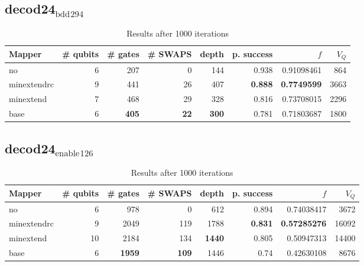 \documentclass[11pt]{article}
\begin{document}
\subsection{decod24\(_{\text{bdd}}\)\(_{\text{294}}\)}
\label{sec:org6fa2b82}
\begin{table}[H]
\caption{\label{tab:org4fd8b84}
Results after 1000 iterations}
\centering
\small
\begin{tabular}{lrrrrrrr}
\hline
Mapper & \# qubits & \# gates & \# SWAPS & depth & p. success & \(f\) & \(V_Q\)\\
\hline
no & 6 & 207 & 0 & 144 & 0.938 & 0.91098461 & 864\\
\hline
minextendrc & 9 & 441 & 26 & 407 & \textbf{0.888} & \textbf{0.7749599} & 3663\\
minextend & 7 & 468 & 29 & 328 & 0.816 & 0.73708015 & 2296\\
base & 6 & \textbf{405} & \textbf{22} & \textbf{300} & 0.781 & 0.71803687 & 1800\\
\hline
\end{tabular}
\end{table}
\subsection{decod24\(_{\text{enable}}\)\(_{\text{126}}\)}
\label{sec:org58956e4}
\begin{table}[H]
\caption{\label{tab:org34467d8}
Results after 1000 iterations}
\centering
\small
\begin{tabular}{lrrrrrrr}
\hline
Mapper & \# qubits & \# gates & \# SWAPS & depth & p. success & \(f\) & \(V_Q\)\\
\hline
no & 6 & 978 & 0 & 612 & 0.894 & 0.74038417 & 3672\\
\hline
minextendrc & 9 & 2049 & 119 & 1788 & \textbf{0.831} & \textbf{0.57285276} & 16092\\
minextend & 10 & 2184 & 134 & \textbf{1440} & 0.805 & 0.50947313 & 14400\\
base & 6 & \textbf{1959} & \textbf{109} & 1446 & 0.74 & 0.42630108 & 8676\\
\hline
\end{tabular}
\end{table}
\end{document}
